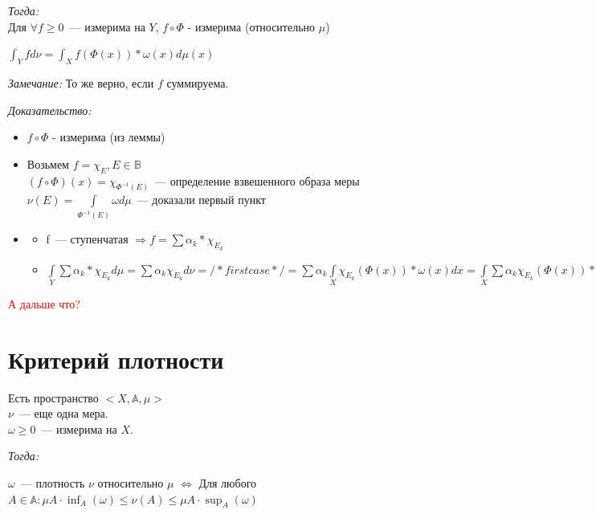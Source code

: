 \documentclass[paper=a4, fontsize=17pt]{article}
\begin{document}
		\emph{Тогда:}\\
		 Для $\forall f \geq 0$~--- измерима на $Y$, $f\circ \Phi$ - измерима (относительно $\mu$)

		$\int_{Y}f d\nu = \int_{X} f(\Phi(x)) * \omega(x) d\mu(x)$

		\emph{Замечание:} То же верно, если $f$ суммируема.

		\emph{Доказательство:}

			\begin{itemize}
				\item $f\circ \Phi$ - измерима (из леммы)
				\item Возьмем $f = \chi_{E} , E\in \mathds{B}$ \\
				$(f\circ \Phi)(x) = \chi_{\Phi^{-1}(E)}$~--- определение взвешенного образа меры \\
				$\nu(E) = \int\limits_{\Phi^{-1}(E)}\omega d\mu$~--- доказали первый пункт
				\item
				\begin{itemize}
					\item f~--- ступенчатая $\Rightarrow f = \sum \alpha_k * \chi_{E_k}$
					\item $\int\limits_{Y} \sum \alpha_k * \chi_{E_k} d\mu = \sum \alpha_k \chi_{E_k} d\nu = /* first case */ = \sum \alpha_k \int\limits_X \chi_{E_k}(\Phi(x))*\omega(x)dx = \int\limits_X \sum \alpha_k \chi_{E_k}(\Phi(x)) * \omega(x) d\mu(x) = \int f \circ \Phi * \omega d\mu$
				\end{itemize}
			\end{itemize}
        \textcolor{red}{А дальше что?}
\section{Критерий плотности}
	Есть пространство $<X, \mathbb{A}, \mu>$ \\
	$\nu$~--- еще одна мера. \\
	$\omega \geq 0$~--- измерима на $X$.

	\emph{Тогда:}

	$\omega$~--- плотность $\nu$ относительно $\mu$ $\Longleftrightarrow$ Для любого $A\in\mathbb{A}:\mu A \cdot \inf_A(\omega) \leq \nu(A) \leq \mu A \cdot \sup_A(\omega)$
\end{document}
